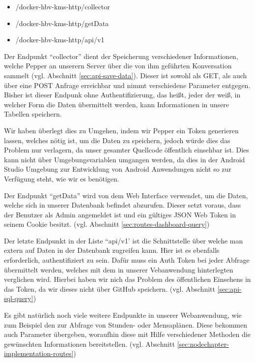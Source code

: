 \begin{itemize}
    \item /docker-hbv-kms-http/collector
    \item /docker-hbv-kms-http/getData
    \item /docker-hbv-kms-http/api/v1
\end{itemize}

Der Endpunkt ``collector'' dient der Speicherung verschiedener Informationen, welche Pepper an unserern Server über die
von ihm geführten Konversation sammelt (vgl. Abschnitt \ref{sec:api-save-data}). Dieser ist sowohl als GET, als auch über eine POST Anfrage erreichbar und nimmt
verschiedene Parameter entgegen. Bisher ist dieser Endpunk ohne Authentifizierung, das heißt, jeder der weiß, in welcher Form
die Daten übermittelt werden, kann Informationen in unsere Tabellen speichern.

Wir haben überlegt dies zu Umgehen, indem wir Pepper ein Token generieren lassen, welches nötig ist,
um die Daten zu speichern, jedoch würde dies das Problem nur verlagern, da unser gesamter Quellcode öffentlich einsehbar ist.
Dies kann nicht über Umgebungsvariablen umgangen werden, da dies in der Android Studio Umgebung zur Entwicklung von Android Anwendungen
nicht so zur Verfügung steht, wie wir es benötigen.

Der Endpunkt ``getData'' wird von dem Web Interface verwendet, um die Daten, welche sich in unserer Datenbank befindet abzurufen.
Dieser setzt voraus, dass der Benutzer als Admin angemeldet ist und ein gültiges JSON Web Token in seinem Cookie besitzt. (vgl. Abschnitt \ref{sec:routes-dashboard-query})

Der letzte Endpunkt in der Liste ``api/v1' ist die Schnittstelle über welche man extern auf Daten in der Datenbank zugreifen kann.
Hier ist es ebenfalls erforderlich, authentifiziert zu sein. Dafür muss ein Auth Token bei jeder Abfrage übermittelt werden,
welches mit dem in unserer Vebanwendung hinterlegten verglichen wird. Hierbei haben wir nich das Problem des öffentlichen
Einsehens in das Token, da wir dieses nicht über GitHub speichern. (vgl. Abschnitt \ref{sec:api-sql-query})

Es gibt natürlich noch viele weitere Endpunkte in unserer Webanwendung, wie zum Beispiel den zur Abfrage von Stunden- oder Mensaplänen.
Diese bekommen auch Parameter übergeben, woraufhin diese mit Hilfe verschiedener Methoden die gewünschten Informationen bereitstellen.
(vgl. Abschnitt \ref{sec:nodechapter-implementation-routes})

